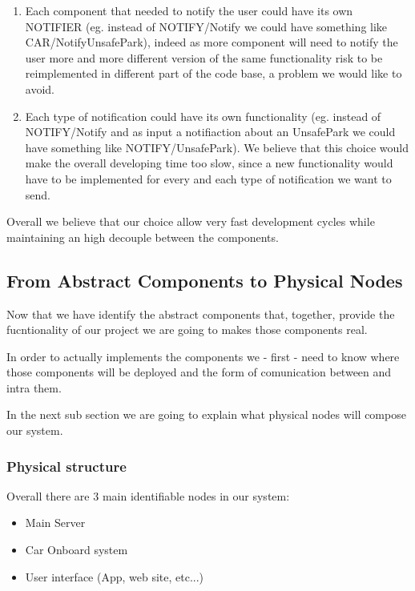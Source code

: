 \documentclass[11pt]{article} %
\begin{document}
\begin{enumerate}
	\item Each component that needed to notify the user could have its own NOTIFIER (eg. instead of NOTIFY/Notify we could have something like CAR/NotifyUnsafePark), indeed as more component will need to notify the user more and more different version of the same functionality risk to be reimplemented in different part of the code base, a problem we would like to avoid.
	\item Each type of notification could have its own functionality (eg. instead of NOTIFY/Notify and as input a notifiaction about an UnsafePark we could have something like NOTIFY/UnsafePark). We believe that this choice would make the overall developing time too slow, since a new functionality would have to be implemented for every and each type of notification we want to send.
\end{enumerate}

Overall we believe that our choice allow very fast development cycles while maintaining an high decouple between the components.

\subsection{From Abstract Components to Physical Nodes}

Now that we have identify the abstract components that, together, provide the fucntionality of our project we are going to makes those components real.

In order to actually implements the components we - first - need to know where those components will be deployed and the form of comunication between and intra them.

In the next sub section we are going to explain what physical nodes will compose our system.

\subsubsection{Physical structure}

Overall there are 3 main identifiable nodes in our system:
\begin{itemize}
	\item Main Server
	\item Car Onboard system
	\item User interface (App, web site, etc...)
\end{itemize}
\end{document}
